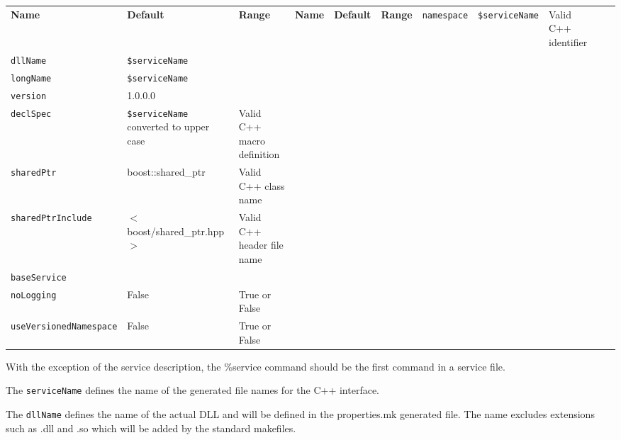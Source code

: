 \begin{longtable}{|p{80pt}|p{150pt}|p{140pt}|l}

 \textbf{Name} & \textbf{Default} & \textbf{Range} & 
\endfirsthead

 \textbf{Name} & \textbf{Default} & \textbf{Range} & 
\endhead

 
\endfoot

\endlastfoot

 \texttt{namespace} & \texttt{\$serviceName} & Valid C++ identifier \\ 

 \texttt{dllName} & \texttt{\$serviceName} &  \\ 

 \texttt{longName} & \texttt{\$serviceName} &  \\ 

 \texttt{version} & 1.0.0.0 &  \\ 

 \texttt{declSpec} & \texttt{\$serviceName} converted to upper case & Valid C++ macro definition \\ 

 \texttt{sharedPtr} & boost::shared\_ptr & Valid C++ class name \\ 

 \texttt{sharedPtrInclude} & $<$boost/shared\_ptr.hpp$>$ & Valid C++ header file name \\ 

 \texttt{baseService} &  &  \\ 

 \texttt{noLogging} & False & True or False \\ 

 \texttt{useVersionedNamespace} & False & True or False \\ 

\end{longtable}
\normalsize
With the exception of the service description, the \%service command should be the first command in a service file.

The \texttt{serviceName} defines the name of the generated file names for the C++ interface.

The \texttt{dllName} defines the name of the actual DLL and will be defined in the properties.mk generated file.
The name excludes extensions such as .dll and .so which will be added by the standard makefiles.

